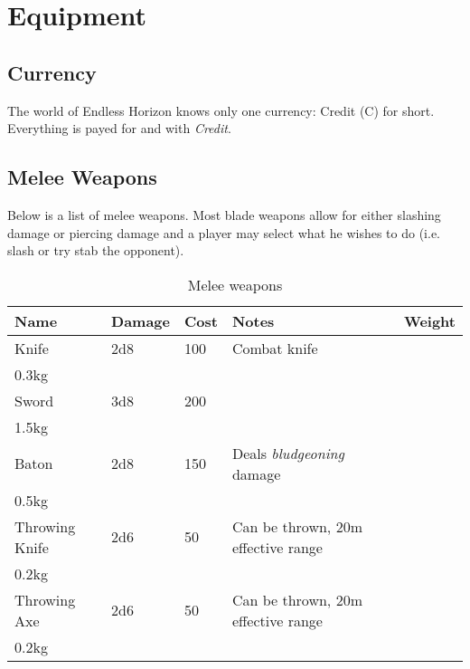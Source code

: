 \chapter{Equipment}
\label{chap:Equipment}

\section{Currency}
\label{sec:9-Currency}

The world of Endless Horizon knows only one currency: Credit (C) for short.
Everything is payed for and with \emph{Credit}.

\section{Melee Weapons}
\label{sec:9-Melee Weapons}

Below is a list of melee weapons. Most blade weapons allow for either slashing
damage or piercing damage and a player may select what he wishes to do (i.e.
slash or try stab the opponent).

\begin{table}
  \label{tab:Melee}
  \caption{Melee weapons}
  \begin{center}
    \begin{tabular}{| l | l | l | l | l |}
      \hline
      \textbf{Name} & \textbf{Damage} & \textbf{Cost} &
      \textbf{Notes} & \textbf{Weight} \\ \hline

      Knife & 2d8 & 100 & Combat knife \\ 0.3kg \\ \hline
      Sword & 3d8 & 200 & \\ 1.5kg \\ \hline
      Baton & 2d8 & 150 & Deals \emph{bludgeoning} damage \\ 0.5kg \\ \hline

      Throwing Knife & 2d6 & 50 & Can be thrown, 20m effective range \\ 0.2kg \\ \hline
      Throwing Axe   & 2d6 & 50 & Can be thrown, 20m effective range \\ 0.2kg \\ \hline

    \end{tabular}
  \end{center}
\end{table}

